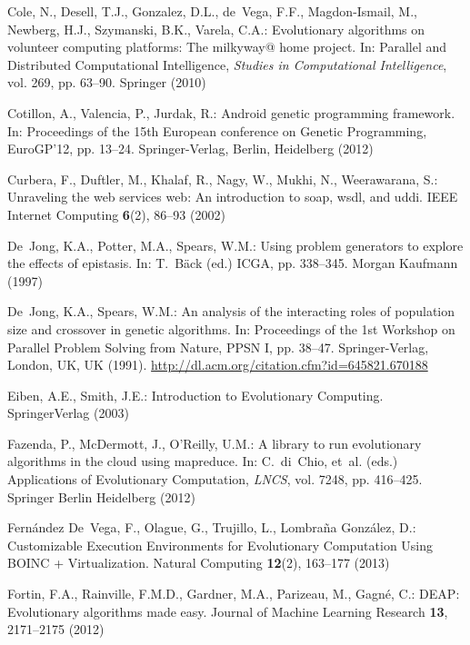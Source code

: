 \begin{thebibliography}{10}
Cole, N., Desell, T.J., Gonzalez, D.L., de~Vega, F.F., Magdon-Ismail, M.,
  Newberg, H.J., Szymanski, B.K., Varela, C.A.: Evolutionary algorithms on
  volunteer computing platforms: The milkyway@ home project.
\newblock In: Parallel and Distributed Computational Intelligence,
  \emph{Studies in Computational Intelligence}, vol. 269, pp. 63--90. Springer
  (2010)

Cotillon, A., Valencia, P., Jurdak, R.: Android genetic programming framework.
\newblock In: Proceedings of the 15th European conference on Genetic
  Programming, EuroGP'12, pp. 13--24. Springer-Verlag, Berlin, Heidelberg
  (2012)

Curbera, F., Duftler, M., Khalaf, R., Nagy, W., Mukhi, N., Weerawarana, S.:
  Unraveling the web services web: An introduction to soap, wsdl, and uddi.
\newblock IEEE Internet Computing \textbf{6}(2), 86--93 (2002)

De~Jong, K.A., Potter, M.A., Spears, W.M.: Using problem generators to explore
  the effects of epistasis.
\newblock In: T.~B\"ack (ed.) ICGA, pp. 338--345. Morgan Kaufmann (1997)

De~Jong, K.A., Spears, W.M.: An analysis of the interacting roles of population
  size and crossover in genetic algorithms.
\newblock In: Proceedings of the 1st Workshop on Parallel Problem Solving from
  Nature, PPSN I, pp. 38--47. Springer-Verlag, London, UK, UK (1991).
\newblock \urlprefix\url{http://dl.acm.org/citation.cfm?id=645821.670188}

Eiben, A.E., Smith, J.E.: Introduction to Evolutionary Computing.
\newblock SpringerVerlag (2003)

Fazenda, P., McDermott, J., O'Reilly, U.M.: A library to run evolutionary
  algorithms in the cloud using mapreduce.
\newblock In: C.~di~Chio, et~al. (eds.) Applications of Evolutionary
  Computation, \emph{LNCS}, vol. 7248, pp. 416--425. Springer Berlin Heidelberg
  (2012)

Fern\'{a}ndez De~Vega, F., Olague, G., Trujillo, L., Lombra\~{n}a Gonz\'{a}lez,
  D.: {Customizable Execution Environments for Evolutionary Computation Using
  BOINC + Virtualization}.
\newblock Natural Computing \textbf{12}(2), 163--177 (2013)

Fortin, F.A., Rainville, F.M.D., Gardner, M.A., Parizeau, M., Gagn\'e, C.:
  {DEAP}: Evolutionary algorithms made easy.
\newblock Journal of Machine Learning Research \textbf{13}, 2171--2175 (2012)


\end{thebibliography}
